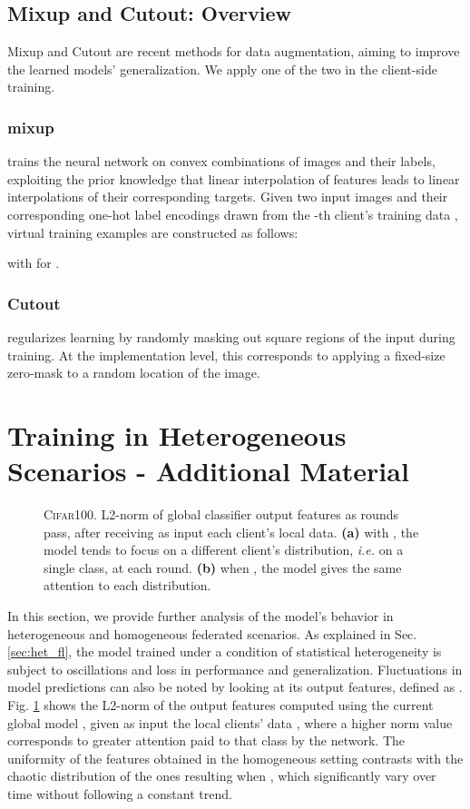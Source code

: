 \subsection{Mixup and Cutout: Overview}
Mixup and Cutout are recent methods for data augmentation, aiming to improve the learned models' generalization. We apply one of the two in the client-side training.

\subsubsection{mixup} \cite{zhang2017mixup} trains the neural network on convex combinations of images and their labels, exploiting the prior knowledge that linear interpolation of features leads to linear interpolations of their corresponding targets. Given two input images  and their corresponding one-hot label encodings  drawn from the -th client's training data , virtual training examples are constructed as follows:

with  for . 
\subsubsection{Cutout} \cite{devries2017improved} regularizes learning by randomly masking out square regions of the input during training. At the implementation level, this corresponds to applying a fixed-size zero-mask to a random location of the image. 

\section{Training in Heterogeneous Scenarios - Additional Material}
\begin{figure}[t]
    \centering
    \caption{\textsc{Cifar100}. L2-norm of global classifier output features as rounds pass, after receiving as input each client's local data. \textbf{(a)} with , the model tends to focus on a different client's distribution, \textit{i.e.} on a single class, at each round. \textbf{(b)} when , the model gives the same attention to each distribution.}
    \label{fig:clf_feats}
\end{figure}
In this section, we provide further analysis of the model's behavior in heterogeneous and homogeneous federated scenarios. As explained in Sec. \ref{sec:het_fl}, the model trained under a condition of statistical heterogeneity is subject to oscillations and loss in performance and generalization. Fluctuations in model predictions can also be noted by looking at its output features, defined as . Fig. \ref{fig:clf_feats} shows the L2-norm of the output features computed using the current global model , given as input the local clients' data , where a higher norm value corresponds to greater attention paid to that class by the network. The uniformity of the features obtained in the homogeneous setting contrasts with the chaotic distribution of the ones resulting when , which significantly vary over time without following a constant trend.

